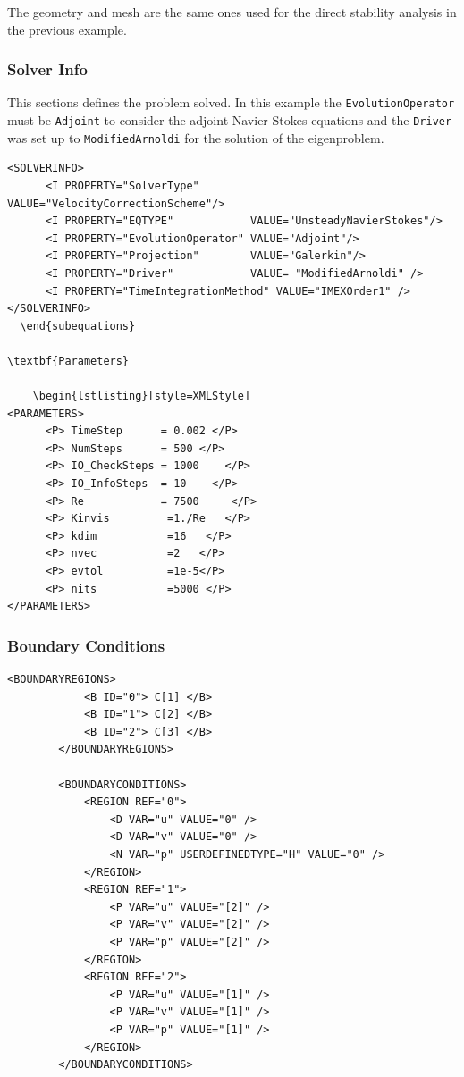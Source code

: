  The geometry and mesh are the same ones used for the direct stability analysis in the previous example.
 
 \subsubsection{Solver Info}
 
 This sections defines the problem solved. In this example the \texttt{EvolutionOperator} must be \texttt{Adjoint} to consider the adjoint Navier-Stokes equations and the \texttt{Driver} was set up to \texttt{ModifiedArnoldi} for the solution of the eigenproblem. 

    \begin{lstlisting}[style=XMLStyle]
<SOLVERINFO>
      <I PROPERTY="SolverType"        VALUE="VelocityCorrectionScheme"/>
      <I PROPERTY="EQTYPE"            VALUE="UnsteadyNavierStokes"/>
      <I PROPERTY="EvolutionOperator" VALUE="Adjoint"/>
      <I PROPERTY="Projection"        VALUE="Galerkin"/>
      <I PROPERTY="Driver"            VALUE= "ModifiedArnoldi" />
      <I PROPERTY="TimeIntegrationMethod" VALUE="IMEXOrder1" />    
</SOLVERINFO>
  \end{subequations}

\textbf{Parameters}

    \begin{lstlisting}[style=XMLStyle]
<PARAMETERS>
      <P> TimeStep      = 0.002 </P>
      <P> NumSteps      = 500 </P>
      <P> IO_CheckSteps = 1000    </P>
      <P> IO_InfoSteps  = 10    </P>
      <P> Re            = 7500     </P>
      <P> Kinvis         =1./Re   </P>
      <P> kdim           =16   </P>
      <P> nvec           =2   </P>
      <P> evtol          =1e-5</P>
      <P> nits           =5000 </P>
</PARAMETERS>
  \end{lstlisting}

\subsubsection{Boundary Conditions}

    \begin{lstlisting}[style=XMLStyle]
 <BOUNDARYREGIONS>
            <B ID="0"> C[1] </B>
            <B ID="1"> C[2] </B>
            <B ID="2"> C[3] </B>
        </BOUNDARYREGIONS>

        <BOUNDARYCONDITIONS>
            <REGION REF="0">
                <D VAR="u" VALUE="0" />
                <D VAR="v" VALUE="0" />
                <N VAR="p" USERDEFINEDTYPE="H" VALUE="0" />
            </REGION>
            <REGION REF="1">
                <P VAR="u" VALUE="[2]" />
                <P VAR="v" VALUE="[2]" />
                <P VAR="p" VALUE="[2]" />
            </REGION>
            <REGION REF="2">
                <P VAR="u" VALUE="[1]" />
                <P VAR="v" VALUE="[1]" />
                <P VAR="p" VALUE="[1]" />
            </REGION>
        </BOUNDARYCONDITIONS>
  \end{lstlisting}


